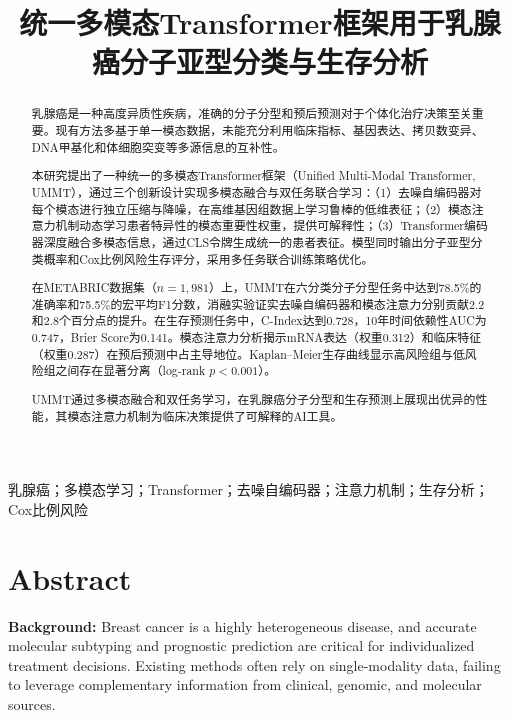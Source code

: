 \documentclass[conference]{IEEEtran}
\title{统一多模态Transformer框架用于乳腺癌分子亚型分类与生存分析}
\author{
    \IEEEauthorblockN{刘书兴}
    \IEEEauthorblockA{
        马来西亚理科大学\\
        槟城, 马来西亚\\
        Email: liushuxing8888@student.usm.my
    }
}
\begin{document}
\maketitle

\begin{abstract}
乳腺癌是一种高度异质性疾病，准确的分子分型和预后预测对于个体化治疗决策至关重要。现有方法多基于单一模态数据，未能充分利用临床指标、基因表达、拷贝数变异、DNA甲基化和体细胞突变等多源信息的互补性。

本研究提出了一种统一的多模态Transformer框架（Unified Multi-Modal Transformer, UMMT），通过三个创新设计实现多模态融合与双任务联合学习：（1）去噪自编码器对每个模态进行独立压缩与降噪，在高维基因组数据上学习鲁棒的低维表征；（2）模态注意力机制动态学习患者特异性的模态重要性权重，提供可解释性；（3）Transformer编码器深度融合多模态信息，通过CLS令牌生成统一的患者表征。模型同时输出分子亚型分类概率和Cox比例风险生存评分，采用多任务联合训练策略优化。

在METABRIC数据集（$n=1{,}981$）上，UMMT在六分类分子分型任务中达到78.5\%的准确率和75.5\%的宏平均F1分数，消融实验证实去噪自编码器和模态注意力分别贡献2.2和2.8个百分点的提升。在生存预测任务中，C-Index达到0.728，10年时间依赖性AUC为0.747，Brier Score为0.141。模态注意力分析揭示mRNA表达（权重0.312）和临床特征（权重0.287）在预后预测中占主导地位。Kaplan--Meier生存曲线显示高风险组与低风险组之间存在显著分离（log-rank $p < 0.001$）。

UMMT通过多模态融合和双任务学习，在乳腺癌分子分型和生存预测上展现出优异的性能，其模态注意力机制为临床决策提供了可解释的AI工具。
\end{abstract}

\begin{IEEEkeywords}
乳腺癌；多模态学习；Transformer；去噪自编码器；注意力机制；生存分析；Cox比例风险
\end{IEEEkeywords}

\section*{Abstract}

\textbf{Background:} Breast cancer is a highly heterogeneous disease, and accurate molecular subtyping and prognostic prediction are critical for individualized treatment decisions. Existing methods often rely on single-modality data, failing to leverage complementary information from clinical, genomic, and molecular sources.
\end{document}
